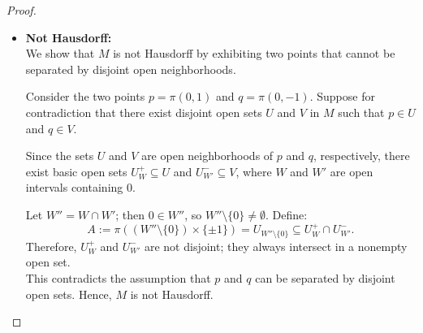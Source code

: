 \begin{problem}
\begin{proof}
\begin{itemize}
\begin{itemize}
        Let $U \subseteq U_{\R \setminus \{0\}}$ be an open subset of $M$, it means $\pi^{-1}(U)$ is open in $X$. Since 
        \begin{equation*}
          \varphi(U) = \{x \colon (x,1) \in \pi^{-1}(U)\} \cup \{x \colon (x, -1) \in \pi^{-1}(U)\}
        \end{equation*}
        is open in $X$, $\varphi$ yields a homeomorphism. Hence, every point with $x \neq 0$ has a neighborhood homeomorphic to $\mathbb{R} \setminus \{0\}$, which is locally Euclidean.
        \item For $x = p$, define the map
        \[
          \psi_+ \colon U^+_{(-1,1)} \to (-1, 1), \quad 
          \psi_+(\pi(x, \pm 1)) = x, \quad \psi_+(p) = 0.
        \]
        This map is well-defined and bijective. To show that $\psi_+$ is a homeomorphism, it suffices to verify that both $\psi_+$ and its inverse are continuous at $p$ and $0$, respectively.\\
        For any $\varepsilon \in (0,1)$, we have
        \[
          \psi_+^{-1}((-\varepsilon, \varepsilon)) = U^+_{(-\varepsilon, \varepsilon)} \quad \text{and} \quad \psi_+(U^+_{(-\varepsilon, \varepsilon)}) = (-\varepsilon, \varepsilon),
        \]
        which shows that $\psi_+$ is continuous at $p$ and its inverse is continuous at $0$. Therefore, $\psi_+$ is a homeomorphism.
        \item For $x = q$, The proof is identical to Case 2.
      \end{itemize}
      \item \textbf{Not Hausdorff:} \\
      We show that $M$ is not Hausdorff by exhibiting two points that cannot be separated by disjoint open neighborhoods.

      Consider the two points $p = \pi(0,1)$ and $q = \pi(0,-1)$. Suppose for contradiction that there exist disjoint open sets $U$ and $V$ in $M$ such that $p \in U$ and $q \in V$.

      Since the sets $U$ and $V$ are open neighborhoods of $p$ and $q$, respectively, there exist basic open sets $U_W^+ \subseteq U$ and $U_{W'}^- \subseteq V$, where $W$ and $W'$ are open intervals containing $0$.
      
      Let $W'' = W \cap W'$; then $0 \in W''$, so $W'' \setminus \{0\} \neq \emptyset$. Define:
      \begin{equation*}
        A := \pi\left( (W'' \setminus \{0\}) \times \{\pm 1\} \right) = U_{W'' \setminus \{0\}} \subseteq U_W^+ \cap U_{W'}^-.
      \end{equation*}
      Therefore, $U_W^+$ and $U_{W'}^-$ are not disjoint; they always intersect in a nonempty open set.\\
      This contradicts the assumption that $p$ and $q$ can be separated by disjoint open sets. Hence, $M$ is not Hausdorff.
    \end{itemize}
  \end{proof}
\end{problem}

